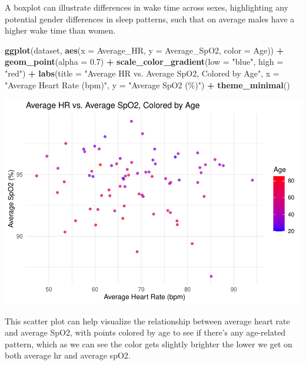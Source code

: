 \documentclass[
]{article}
\newenvironment{Shaded}{\begin{snugshade}}{\end{snugshade}}
\newcommand{\AttributeTok}[1]{\textcolor[rgb]{0.13,0.29,0.53}{#1}}
\newcommand{\FloatTok}[1]{\textcolor[rgb]{0.00,0.00,0.81}{#1}}
\newcommand{\FunctionTok}[1]{\textcolor[rgb]{0.13,0.29,0.53}{\textbf{#1}}}
\newcommand{\NormalTok}[1]{#1}
\newcommand{\SpecialCharTok}[1]{\textcolor[rgb]{0.81,0.36,0.00}{\textbf{#1}}}
\newcommand{\StringTok}[1]{\textcolor[rgb]{0.31,0.60,0.02}{#1}}
\begin{document}
A boxplot can illustrate differences in wake time across sexes,
highlighting any potential gender differences in sleep patterns, such
that on average males have a higher wake time than women.

\begin{Shaded}
\begin{Highlighting}[]
\FunctionTok{ggplot}\NormalTok{(dataset, }\FunctionTok{aes}\NormalTok{(}\AttributeTok{x =}\NormalTok{ Average\_HR, }\AttributeTok{y =}\NormalTok{ Average\_SpO2, }\AttributeTok{color =}\NormalTok{ Age)) }\SpecialCharTok{+} 
  \FunctionTok{geom\_point}\NormalTok{(}\AttributeTok{alpha =} \FloatTok{0.7}\NormalTok{) }\SpecialCharTok{+} 
  \FunctionTok{scale\_color\_gradient}\NormalTok{(}\AttributeTok{low =} \StringTok{"blue"}\NormalTok{, }\AttributeTok{high =} \StringTok{"red"}\NormalTok{) }\SpecialCharTok{+} 
  \FunctionTok{labs}\NormalTok{(}\AttributeTok{title =} \StringTok{"Average HR vs. Average SpO2, Colored by Age"}\NormalTok{, }\AttributeTok{x =} \StringTok{"Average Heart Rate (bpm)"}\NormalTok{, }\AttributeTok{y =} \StringTok{"Average SpO2 (\%)"}\NormalTok{) }\SpecialCharTok{+} 
  \FunctionTok{theme\_minimal}\NormalTok{()}
\end{Highlighting}
\end{Shaded}

\includegraphics{602_project_files/figure-latex/unnamed-chunk-17-1.pdf}

This scatter plot can help visualize the relationship between average
heart rate and average SpO2, with points colored by age to see if
there's any age-related pattern, which as we can see the color gets
slightly brighter the lower we get on both average hr and average spO2.
\end{document}

